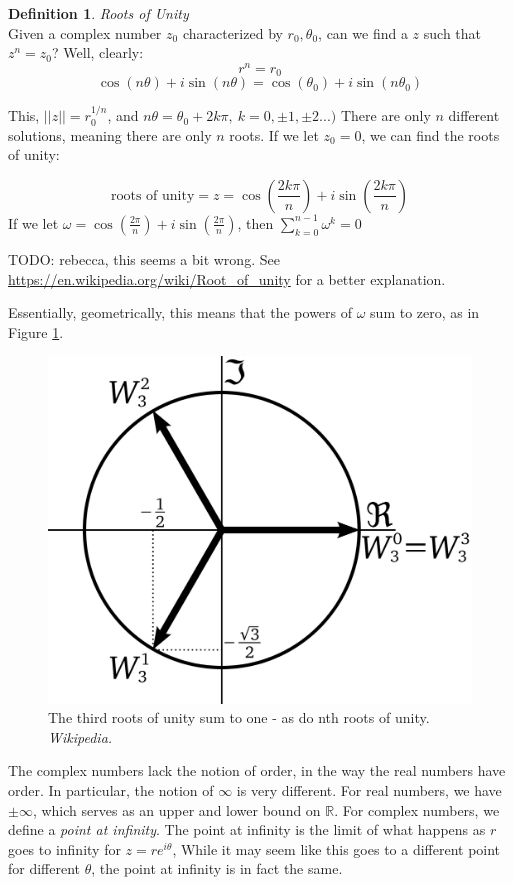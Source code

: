 \documentclass{article}
\theoremstyle{definition}
\newtheorem{definition}{Definition}[section]
\newcommand{\Def}[2]{
\begin{shaded*}
\begin{definition}{\textit{#1}}\\#2\end{definition}
\end{shaded*}
}
\newcommand{\norm}[1]{\left|\left|#1\right|\right|}
\def\R{\mathbb{R}}
\begin{document}
\Def{Roots of Unity}{Given a complex number $z_0$ characterized by $r_0, \theta_0$, can we find a $z$ such that $z^n = z_0$? Well, clearly:
$$r^n = r_0$$
$$\cos(n\theta) + i \sin(n\theta) = \cos(\theta_0) + i \sin(n\theta_0)$$

This, $\norm{z} = r_0^{1/n}$, and $n\theta = \theta_0 + 2k\pi,\ k = 0, \pm 1, \pm 2...)$ There are only $n$ different solutions, meaning there are only $n$ roots. If we let $z_0 = 0$, we can find the roots of unity:

$$\text{roots of unity} = z = \cos(\frac{2k\pi}{n}) + i \sin(\frac{2k\pi}{n})$$
If we let $\omega = \cos(\frac{2\pi}{n}) + i \sin(\frac{2\pi}{n})$, then $\sum_{k=0}^{n-1} \omega^k = 0$

TODO: rebecca, this seems a bit wrong. See \href{https://en.wikipedia.org/wiki/Root_of_unity}{https://en.wikipedia.org/wiki/Root\_of\_unity} for a better explanation.

Essentially, geometrically, this means that the powers of $\omega$ sum to zero, as in Figure \ref{fig:3rdrootsofunity}.

\begin{figure}[H]
	\centering
	\includegraphics[width=0.5\linewidth]{3rd_roots_of_unity}
	\caption{The third roots of unity sum to one - as do nth roots of unity. \textit{Wikipedia.}}
	\label{fig:3rdrootsofunity}
\end{figure}

}

The complex numbers lack the notion of order, in the way the real numbers have order. In particular, the notion of $\infty$ is very different. For real numbers, we have $\pm \infty$, which serves as an upper and lower bound on $\R$. For complex numbers, we define a \textit{point at infinity}. The point at infinity is the limit of what happens as $r$ goes to infinity for $z=r e^{i\theta}$, While it may seem like this goes to a different point for different $\theta$, the point at infinity is in fact the same.
\end{document}
